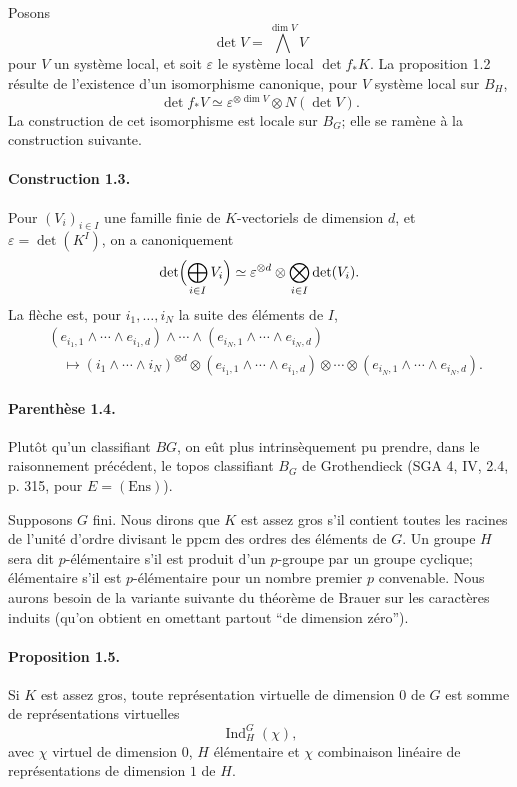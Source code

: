 \documentclass[10pt,letterpaper]{article}
\newcommand{\Ind}{\operatorname{Ind}}
\providecommand{\Ind}{\operatorname{Ind}}
\begin{document}
Posons
\[
\det V=\bigwedge^{\dim V}V
\]
pour \(V\) un système local, et soit \(\varepsilon\) le système local \(\det f_*K\). La proposition 1.2 résulte de l'existence d'un isomorphisme canonique, pour \(V\) système local sur \(B_H\),
\[
\det f_*V\simeq \varepsilon^{\otimes\dim V}\otimes N(\det V).
\]
La construction de cet isomorphisme est locale sur \(B_G\); elle se ramène à la construction suivante.

\paragraph{Construction 1.3.} Pour \((V_i)_{i\in I}\) une famille finie de \(K\)-vectoriels de dimension \(d\), et \(\varepsilon=\det(K^I)\), on a canoniquement
\[
\det\Bigl(\bigoplus_{i\in I}V_i\Bigr)\simeq
\varepsilon^{\otimes d}\otimes\bigotimes_{i\in I}\det(V_i).
\]
La flèche est, pour \(i_1,\ldots,i_N\) la suite des éléments de \(I\),
\[
\begin{aligned}
&(e_{i_1,1}\wedge\cdots\wedge e_{i_1,d})\wedge\cdots\wedge
(e_{i_N,1}\wedge\cdots\wedge e_{i_N,d}) \\
&\quad\longmapsto
(i_1\wedge\cdots\wedge i_N)^{\otimes d}\otimes
(e_{i_1,1}\wedge\cdots\wedge e_{i_1,d})\otimes\cdots\otimes
(e_{i_N,1}\wedge\cdots\wedge e_{i_N,d}).
\end{aligned}
\]

\paragraph{Parenthèse 1.4.} Plutôt qu'un classifiant \(BG\), on eût plus intrinsèquement pu prendre, dans le raisonnement précédent, le topos classifiant \(B_G\) de Grothendieck (SGA 4, IV, 2.4, p. 315, pour \(E=(\mathrm{Ens})\)).

Supposons \(G\) fini. Nous dirons que \(K\) est assez gros s'il contient toutes les racines de l'unité d'ordre divisant le ppcm des ordres des éléments de \(G\). Un groupe \(H\) sera dit \(p\)-élémentaire s'il est produit d'un \(p\)-groupe par un groupe cyclique; élémentaire s'il est \(p\)-élémentaire pour un nombre premier \(p\) convenable. Nous aurons besoin de la variante suivante du théorème de Brauer sur les caractères induits (qu'on obtient en omettant partout ``de dimension zéro'').

\paragraph{Proposition 1.5.} Si \(K\) est assez gros, toute représentation virtuelle de dimension \(0\) de \(G\) est somme de représentations virtuelles
\[
\Ind_H^G(\chi),
\]
avec \(\chi\) virtuel de dimension \(0\), \(H\) élémentaire et \(\chi\) combinaison linéaire de représentations de dimension \(1\) de \(H\).
\end{document}

